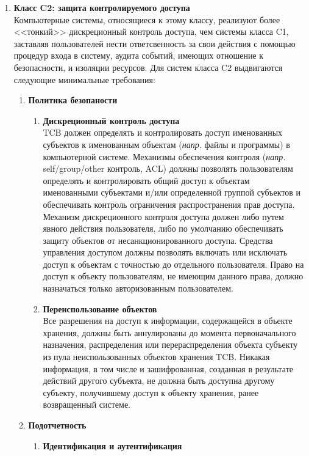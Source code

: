 \begin{enumerate}
\begin{enumerate}
		\item{\textbf{Класс C2: защита контролируемого доступа}}\\
		Компьютерные системы, относящиеся к этому классу, реализуют более <<тонкий>> дискреционный контроль доступа, чем системы класса C1, заставляя пользователей нести ответсвенность за свои
		действия с помощью процедур входа в систему, аудита событий, имеющих отношение к безопасности, и изоляции ресурсов. Для систем класса C2 выдвигаются следующие минимальные требования:
		\begin{enumerate}
			\item{\textbf{Политика безопаности}}
			\begin{enumerate}
				\item{\textbf{Дискреционный контроль доступа}}\\
				TCB должен определять и контролировать доступ именованных субъектов к именованным объектам (\textit{напр.} файлы и программы) в компьютерной системе. Механизмы обеспечения контроля
				(\textit{напр.} self/group/other контроль, ACL) должны позволять пользователям определять и контролировать общий доступ к объектам именованными субъектами и/или определенной группой
				субъектов и обеспечивать контроль ограничения распространения прав доступа. Механизм дискреционного контроля доступа должен либо путем явного действия пользователя, либо по умолчанию
				обеспечивать защиту объектов от несанкционированного доступа. Средства управления доступом должны позволять включать или исключать доступ к объектам с точностью до отдельного
				пользователя. Право на доступ к объекту пользователям, не имеющим данного права, должно назначаться только авторизованным пользователем. 
				\item{\textbf{Переиспользование объектов}}\\
				Все разрешения на доступ к информации, содержащейся в объекте хранения, должны быть аннулированы до момента первоначального назначения, распределения или перераспределения объекта
				субъекту из пула неиспользованных объектов хранения TCB. Никакая информация, в том числе и зашифрованная, созданная в результате действий другого субъекта, не должна быть доступна
				другому субъекту, получившему доступ к объекту хранения, ранее возвращенный системе.  	
			\end{enumerate}
			\item{\textbf{Подотчетность}}
			\begin{enumerate}
				\item{\textbf{Идентификация и аутентификация}}\\

\end{enumerate}
\end{enumerate}
\end{enumerate}
\end{enumerate}
